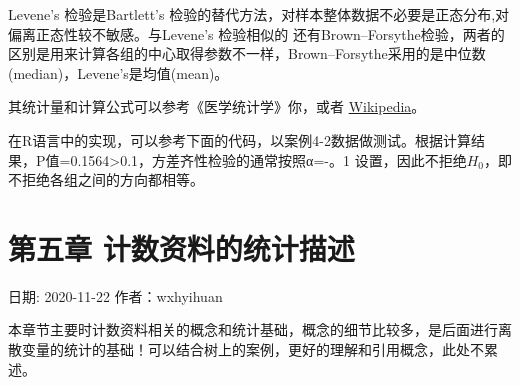 \documentclass[
]{article}
\newenvironment{Shaded}{\begin{snugshade}}{\end{snugshade}}
\newcommand{\CommentTok}[1]{\textcolor[rgb]{0.56,0.35,0.01}{\textit{#1}}}
\newcommand{\DataTypeTok}[1]{\textcolor[rgb]{0.13,0.29,0.53}{#1}}
\newcommand{\KeywordTok}[1]{\textcolor[rgb]{0.13,0.29,0.53}{\textbf{#1}}}
\newcommand{\NormalTok}[1]{#1}
\newcommand{\OperatorTok}[1]{\textcolor[rgb]{0.81,0.36,0.00}{\textbf{#1}}}
\newcommand{\StringTok}[1]{\textcolor[rgb]{0.31,0.60,0.02}{#1}}
\begin{document}
Levene's 检验是Bartlett's 检验的替代方法，对样本整体数据不必要是正态分布,对偏离正态性较不敏感。与Levene's 检验相似的
还有Brown--Forsythe检验，两者的区别是用来计算各组的中心取得参数不一样，Brown--Forsythe采用的是中位数(median)，Levene's是均值(mean)。

其统计量和计算公式可以参考《医学统计学》你，或者 \href{https://en.wikipedia.org/wiki/Levene\%27s_test}{Wikipedia}。

在R语言中的实现，可以参考下面的代码，以案例4-2数据做测试。根据计算结果，P值=0.1564\textgreater0.1，方差齐性检验的通常按照α=-。1
设置，因此不拒绝\(H_0\)，即不拒绝各组之间的方向都相等。

\begin{Shaded}
\end{Shaded}

\hypertarget{ux7b2cux4e94ux7ae0-ux8ba1ux6570ux8d44ux6599ux7684ux7edfux8ba1ux63cfux8ff0}{%
\section{第五章 计数资料的统计描述}\label{ux7b2cux4e94ux7ae0-ux8ba1ux6570ux8d44ux6599ux7684ux7edfux8ba1ux63cfux8ff0}}

日期: 2020-11-22
作者：wxhyihuan

本章节主要时计数资料相关的概念和统计基础，概念的细节比较多，是后面进行离散变量的统计的基础！可以结合树上的案例，更好的理解和引用概念，此处不累述。
\end{document}
